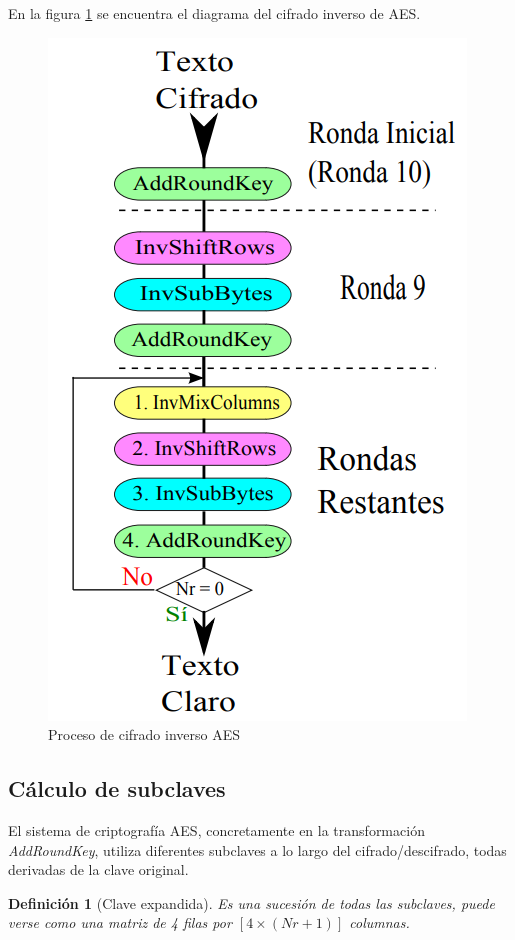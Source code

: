 \documentclass[peerreview]{IEEEtran}
\newtheorem{defin}{\textbf{Definición}}
\begin{document}
En la figura \ref{fig:9} se encuentra el diagrama del cifrado inverso de AES.
\begin{figure}[h]
	\includegraphics[scale=0.6]{figuras/diagrama2.png}
	\centering
	\caption{Proceso de cifrado inverso AES}
	\label{fig:9}
\end{figure}
\subsection{Cálculo de subclaves}
El sistema de criptografía AES, concretamente en la transformación \textit{AddRoundKey}, utiliza diferentes subclaves a lo largo del cifrado/descifrado, todas derivadas de la clave original.\\

\begin{defin}[Clave expandida]
	Es una sucesión de todas las subclaves, puede verse como una matriz de 4 filas por $[4 \times (Nr +1)]$ columnas.
\end{defin}
\end{document}
